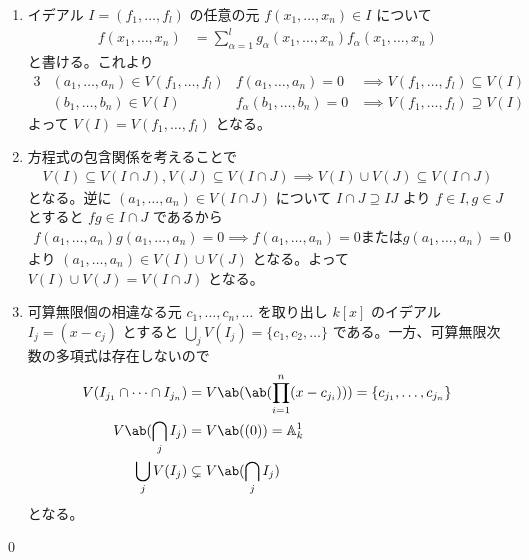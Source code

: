 \documentclass[uplatex,dvipdfmx,a4paper,11pt]{jlreq}
\makeatletter
\renewcommand{\AA}{\mathbb{A}}
\numberwithin{equation}{section}
\theoremstyle{definition}
\renewenvironment{proof}[1][\proofname]{\par
  \normalfont
  \topsep6\p@\@plus6\p@ \trivlist
  \item[\hskip\labelsep{\bfseries #1}\@addpunct{\bfseries}]\ignorespaces\quad\par
}{%
  \qed\endtrivlist\@endpefalse
}
\renewcommand\proofname{証明}
\makeatother
\begin{document}
\begin{proof}
  \begin{enumerate}
    \item イデアル $I = (f_1,\ldots,f_l)$ の任意の元 $f(x_1,\ldots,x_n)\in I$ について
          \begin{align}
            f(x_1,\ldots,x_n) & = \sum_{\alpha=1}^{l}g_\alpha(x_1,\ldots,x_n)f_\alpha(x_1,\ldots,x_n)
          \end{align}
          と書ける。これより
          \begin{alignat}{3}
             & (a_1,\ldots,a_n)\in V(f_1,\ldots,f_l) & f(a_1,\ldots,a_n) = 0        & \implies V(f_1,\ldots,f_l)\subseteq V(I) \\
             & (b_1,\ldots,b_n)\in V(I)              & f_\alpha(b_1,\ldots,b_n) = 0 & \implies V(f_1,\ldots,f_l)\supseteq V(I)
          \end{alignat}
          よって $V(I) = V(f_1,\ldots,f_l)$ となる。
    \item 方程式の包含関係を考えることで
          \begin{align}
            V(I) \subseteq V(I\cap J), V(J) \subseteq V(I\cap J) \implies V(I) \cup V(J) \subseteq V(I\cap J)
          \end{align}
          となる。逆に $(a_1,\ldots,a_n)\in V(I\cap J)$ について $I\cap J\supseteq IJ$ より $f\in I, g\in J$ とすると $fg\in I\cap J$ であるから
          \begin{align}
            f(a_1,\ldots,a_n)g(a_1,\ldots,a_n) = 0 \implies f(a_1,\ldots,a_n) = 0 または g(a_1,\ldots,a_n) = 0
          \end{align}
          より $(a_1,\ldots,a_n)\in V(I)\cup V(J)$ となる。よって $V(I) \cup V(J) = V(I\cap J)$ となる。
    \item 可算無限個の相違なる元 $c_1,\ldots,c_n,\ldots$ を取り出し $k[x]$ のイデアル $I_j = (x - c_j)$ とすると $\bigcup_j V(I_j) = \lbrace c_1, c_2, \ldots \rbrace$ である。一方、可算無限次数の多項式は存在しないので
          \begin{align}
            V(I_{j_1}\cap \cdots\cap I_{j_n}) & = V\ab(\ab(\prod_{i=1}^{n}(x - c_{j_i}))) = \lbrace c_{j_1},\ldots,c_{j_n} \rbrace \\
            V\ab(\bigcap_j I_j)               & = V\ab((0)) = \AA_k^1                                                              \\
            \bigcup_j V(I_j)                  & \subsetneq V\ab(\bigcap_j I_j)
          \end{align}
          となる。

\end{enumerate}
\end{proof}
\end{document}

